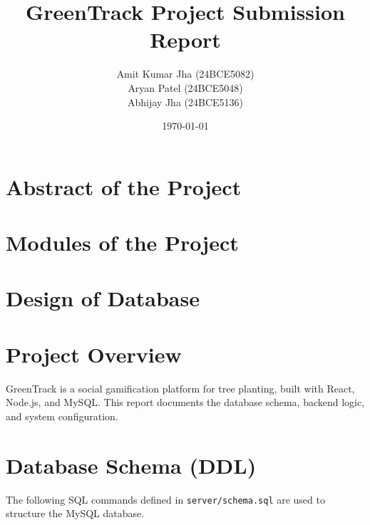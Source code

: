 \documentclass[11pt,a4paper]{article}
\title{GreenTrack Project Submission Report}
\author{Amit Kumar Jha (24BCE5082) \\ Aryan Patel (24BCE5048) \\ Abhijay Jha (24BCE5136)}
\date{\today}
\begin{document}
\maketitle
\tableofcontents
\newpage


\section{Abstract of the Project}
\begin{figure}[H]
    \centering
\end{figure}
\clearpage

\section{Modules of the Project}
\begin{figure}[H]
    \centering
\end{figure}
\clearpage

\section{Design of Database}
\begin{figure}[H]
    \centering
\end{figure}
\clearpage


\section{Project Overview}
GreenTrack is a social gamification platform for tree planting, built with React, Node.js, and MySQL. This report documents the database schema, backend logic, and system configuration.

\section{Database Schema (DDL)}
The following SQL commands defined in \texttt{server/schema.sql} are used to structure the MySQL database.
\end{document}
